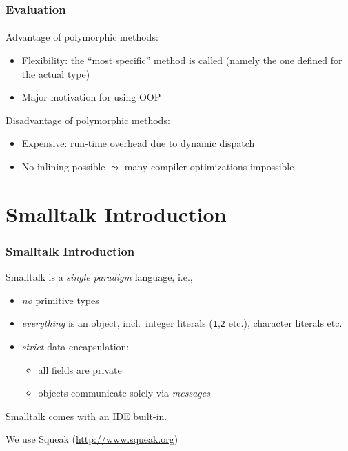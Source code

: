 \documentclass{beamer}
\begin{document}
\begin{frame}[fragile]
\frametitle{Evaluation}
\framesubtitle{}
Advantage of polymorphic methods: 
\begin{itemize}
\item Flexibility: the ``most specific'' method is called
(namely the one defined for the actual type)
\item Major motivation for using OOP
\end{itemize}
\bigskip

Disadvantage of polymorphic methods: 
\begin{itemize}
\item Expensive: run-time overhead due to dynamic dispatch
\item No inlining possible $\leadsto$ many compiler optimizations
impossible
\end{itemize}

\end{frame}





\section{Smalltalk Introduction}

\begin{frame}[fragile]
\frametitle{Smalltalk Introduction}

Smalltalk is a \emph{single paradigm} language, i.e.,
\begin{itemize}
  \item \emph{no} primitive types 
  \item \emph{everything} is an object, incl.\ integer
    literals (\texttt{1},\texttt{2} etc.), character literals etc.
  \item \emph{strict} data encapsulation:
    \begin{itemize}
    \item all fields are private
    \item objects communicate solely via \emph{messages}
    \end{itemize}
\end{itemize}

\bigskip\pause

Smalltalk comes with an IDE built-in.

\bigskip

We use Squeak (\url{http://www.squeak.org})

\end{frame}
\end{document}
